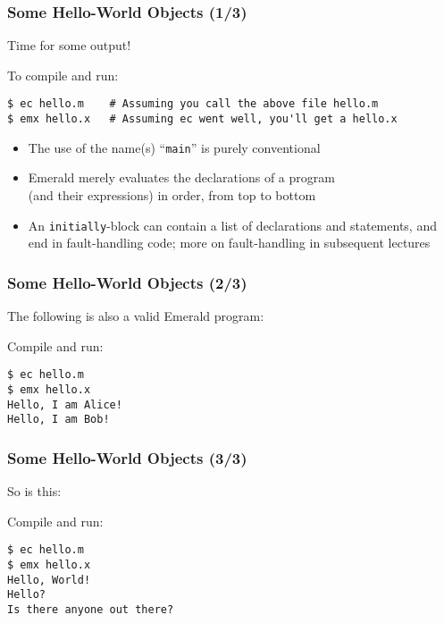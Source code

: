 \begin{frame}[fragile]

\frametitle{Some Hello-World Objects (1/3)}

Time for some output!


To compile and run:

\begin{lstlisting}
$ ec hello.m    # Assuming you call the above file hello.m
$ emx hello.x   # Assuming ec went well, you'll get a hello.x
\end{lstlisting}

\begin{itemize}

\item The use of the name(s) ``\texttt{main}'' is purely conventional

\item Emerald merely evaluates the declarations of a program\\ (and
their expressions) in order, from top to bottom

\item An \texttt{initially}-block can contain a list of declarations
and statements, and end in fault-handling code; more on fault-handling
in subsequent lectures

\end{itemize}

\end{frame}

\begin{frame}[fragile]

\frametitle{Some Hello-World Objects (2/3)}

The following is also a valid Emerald program:


Compile and run:

\begin{lstlisting}
$ ec hello.m
$ emx hello.x
Hello, I am Alice!
Hello, I am Bob!
\end{lstlisting}

\end{frame}

\begin{frame}[fragile]

\frametitle{Some Hello-World Objects (3/3)}

So is this:


Compile and run:

\begin{lstlisting}
$ ec hello.m
$ emx hello.x
Hello, World!
Hello?
Is there anyone out there?
\end{lstlisting}

\end{frame}
